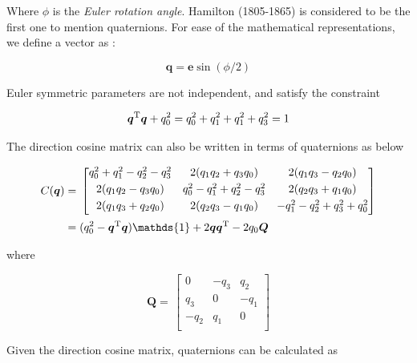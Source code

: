 Where $\phi$ is the \emph{Euler rotation angle}. 
Hamilton (1805-1865) is considered to be the first one to mention quaternions. 
For ease of the mathematical representations, we define a vector as :

\begin{equation}
\label{eqn:quat3}
\bm{q} = \bm{e}\sin{(\phi/2)}
\end{equation}

Euler symmetric parameters are not independent, and satisfy the constraint

\begin{equation}
\label{eqn:quatNormConstraint}
\bm{q}^{\rm T} \bm{q} + q_0^2 = q_0^2 + q_1^2 +q_1^2 +q_3^2 = 1
\end{equation}

The direction cosine matrix can also be written in terms of quaternions as below

\begin{align}\label{eqn:Cquat}
\begin{split}
C(\bm{q})
 & =\,
\begin{bmatrix}
q_0^2 + q_1^2 - q_2^2 - q_3^2 & 2(q_1 q_2 + q_3 q_0) & 2(q_1 q_3 - q_2 q_0)\\[0.3em]
2(q_1 q_2 - q_3 q_0) & q_0^2 - q_1^2 + q_2^2 - q_3^2 & 2(q_2 q_3 + q_1 q_0)\\[0.3em]
2(q_1 q_3 + q_2 q_0) & 2(q_2 q_3 - q_1 q_0) & -q_1^2 - q_2^2 + q_3^2 + q_0^2\\[0.3em]
\end{bmatrix}
\\
& = (q_0^2 - \bm{q}^{\rm T}\bm{q} )\mathds{1} + 2\bm{q}\bm{q}^{\rm T} - 2q_0\bm{Q}
\end{split}
\end{align}
 
where

\begin{equation}
\label{eqn:Qmatrix}
\bm{Q}
=\,
\begin{bmatrix}
0 & - q_3 & q_2 \\[0.3em]
q_3 & 0 & - q_1 \\[0.3em]
- q_2 & q_1 & 0\\[0.3em]
\end{bmatrix}
\end{equation}

Given the direction cosine matrix, quaternions can be calculated as

